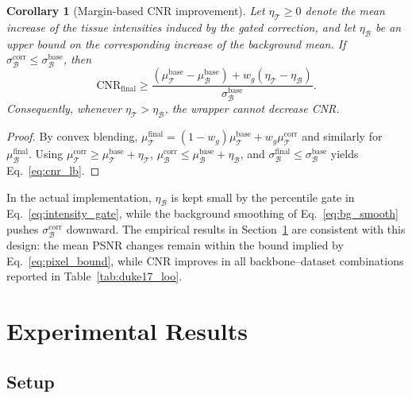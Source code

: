 \documentclass{ieeetj}
\newtheorem{corollary}{Corollary}
\begin{document}
\begin{corollary}[Margin-based CNR improvement]
\label{cor:cnr}
Let $\eta_\mathcal{T}\ge 0$ denote the mean increase of the tissue intensities induced by the gated correction, and let $\eta_\mathcal{B}$ be an upper bound on the corresponding increase of the background mean. If $\sigma_\mathcal{B}^{\text{corr}}\le \sigma_\mathcal{B}^{\text{base}}$, then
\begin{equation}
\mathrm{CNR}_{\mathrm{final}} \ge \frac{(\mu_\mathcal{T}^{\text{base}}-\mu_\mathcal{B}^{\text{base}}) + w_g(\eta_\mathcal{T}-\eta_\mathcal{B})}{\sigma_\mathcal{B}^{\text{base}}}.
\label{eq:cnr_lb}
\end{equation}
Consequently, whenever $\eta_\mathcal{T}>\eta_\mathcal{B}$, the wrapper cannot decrease CNR.
\end{corollary}
\begin{proof}
By convex blending, $\mu_\mathcal{T}^{\text{final}}=(1-w_g)\mu_\mathcal{T}^{\text{base}}+w_g\mu_\mathcal{T}^{\text{corr}}$ and similarly for $\mu_\mathcal{B}^{\text{final}}$. Using $\mu_\mathcal{T}^{\text{corr}}\ge\mu_\mathcal{T}^{\text{base}}+\eta_\mathcal{T}$, $\mu_\mathcal{B}^{\text{corr}}\le\mu_\mathcal{B}^{\text{base}}+\eta_\mathcal{B}$, and $\sigma_\mathcal{B}^{\text{final}}\le\sigma_\mathcal{B}^{\text{base}}$ yields Eq.~\eqref{eq:cnr_lb}.
\end{proof}

In the actual implementation, $\eta_\mathcal{B}$ is kept small by the percentile gate in Eq.~\eqref{eq:intensity_gate}, while the background smoothing of Eq.~\eqref{eq:bg_smooth} pushes $\sigma_\mathcal{B}^{\text{corr}}$ downward. The empirical results in Section~\ref{sec:experiments} are consistent with this design: the mean PSNR changes remain within the bound implied by Eq.~\eqref{eq:pixel_bound}, while CNR improves in all backbone--dataset combinations reported in Table~\ref{tab:duke17_loo}.

\section{Experimental Results}
\label{sec:experiments}

\subsection{Setup}
\label{sec:setup}
\end{document}
